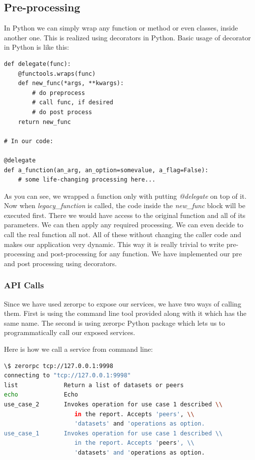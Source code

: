 \subsection{Pre-processing}
In Python we can simply wrap any function or method or even classes, inside another one.
This is realized using decorators in Python. 
Basic usage of decorator in Python is like this:

\begin{lstlisting}[caption={Pre-processing with decorators in Python}]
def delegate(func):
    @functools.wraps(func)
    def new_func(*args, **kwargs):
        # do preprocess
        # call func, if desired
        # do post process
    return new_func

# In our code:

@delegate
def a_function(an_arg, an_option=somevalue, a_flag=False):
    # some life-changing processing here...

\end{lstlisting}

As you can see, we wrapped a function only with putting \textit{@delegate} on top of it.
Now when \textit{legacy\_function} is called, the code inside the \textit{new\_func} block
will be executed first. 
There we would have access to the original function and all of its parameters. 
We can then apply any required processing. 
We can even decide to call the real function all not.
All of these without changing the caller code and makes our application very dynamic.
This way it is really trivial to write pre-processing and post-processing for any function.
We have implemented our pre and post processing using decorators.

\subsubsection{API Calls}
Since we have used zerorpc to expose our services, we have two ways of calling them.
First is using the command line tool provided along with it which has the same name.
The second is using zerorpc Python package which lets us to programmatically call
our exposed services.

Here is how we call a service from command line:

\begin{lstlisting}[language=sh, caption={Quering an API endpoint for available commands}]
\$ zerorpc tcp://127.0.0.1:9998
connecting to "tcp://127.0.0.1:9998"
list             Return a list of datasets or peers
echo             Echo
use_case_2       Invokes operation for use case 1 described \\
					in the report. Accepts 'peers', \\
					'datasets' and 'operations as option.
use_case_1       Invokes operation for use case 1 described \\
					in the report. Accepts 'peers', \\
					'datasets' and 'operations as option.
\end{lstlisting}

